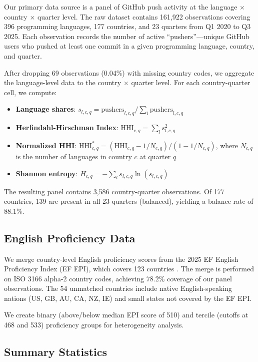 \documentclass[12pt]{article}
\begin{document}
Our primary data source is a panel of GitHub push activity at the language $\times$ country $\times$ quarter level. The raw dataset contains 161,922 observations covering 396 programming languages, 177 countries, and 23 quarters from Q1 2020 to Q3 2025. Each observation records the number of active ``pushers''---unique GitHub users who pushed at least one commit in a given programming language, country, and quarter.

After dropping 69 observations (0.04\%) with missing country codes, we aggregate the language-level data to the country $\times$ quarter level. For each country-quarter cell, we compute:

\begin{itemize}
    \item \textbf{Language shares}: $s_{l,c,q} = \text{pushers}_{l,c,q} / \sum_l \text{pushers}_{l,c,q}$
    \item \textbf{Herfindahl-Hirschman Index}: $\text{HHI}_{c,q} = \sum_l s_{l,c,q}^2$
    \item \textbf{Normalized HHI}: $\text{HHI}^*_{c,q} = (\text{HHI}_{c,q} - 1/N_{c,q}) / (1 - 1/N_{c,q})$, where $N_{c,q}$ is the number of languages in country $c$ at quarter $q$
    \item \textbf{Shannon entropy}: $H_{c,q} = -\sum_l s_{l,c,q} \ln(s_{l,c,q})$
\end{itemize}

The resulting panel contains 3,586 country-quarter observations. Of 177 countries, 139 are present in all 23 quarters (balanced), yielding a balance rate of 88.1\%.

\subsection{English Proficiency Data}

We merge country-level English proficiency scores from the 2025 EF English Proficiency Index (EF EPI), which covers 123 countries \citep{efset2025epi}. The merge is performed on ISO 3166 alpha-2 country codes, achieving 78.2\% coverage of our panel observations. The 54 unmatched countries include native English-speaking nations (US, GB, AU, CA, NZ, IE) and small states not covered by the EF EPI.

We create binary (above/below median EPI score of 510) and tercile (cutoffs at 468 and 533) proficiency groups for heterogeneity analysis.

\subsection{Summary Statistics}
\end{document}
